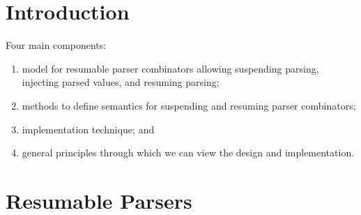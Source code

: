 \section{Introduction}

Four main components:

\begin{enumerate}
  \item model for resumable parser combinators allowing suspending parsing, injecting parsed values, and resuming parsing;
  \item methods to define semantics for suspending and resuming parser combinators;
  \item implementation technique; and
  \item general principles through which we can view the design and implementation.
\end{enumerate}



\section{Resumable Parsers}
